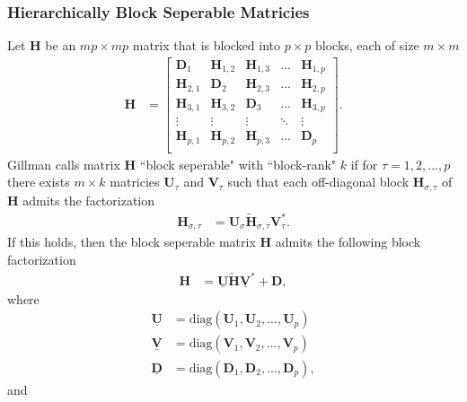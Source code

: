 \subsubsection{Hierarchically Block Seperable Matricies}

Let $\textbf{H}$ be an $mp \times mp$ matrix that is blocked into $p \times p$ blocks, each of size $m \times m$
\begin{align}
    \textbf{H} &=
    \begin{bmatrix}
        \textbf{D}_1     & \textbf{H}_{1,2} & \textbf{H}_{1,3} & ...    & \textbf{H}_{1,p} \\
        \textbf{H}_{2,1} & \textbf{D}_{2}   & \textbf{H}_{2,3} & ...    & \textbf{H}_{2,p} \\
        \textbf{H}_{3,1} & \textbf{H}_{3,2} & \textbf{D}_{3}   & ...    & \textbf{H}_{3,p} \\
        \vdots           & \vdots           & \vdots           & \ddots & \vdots           \\
        \textbf{H}_{p,1} & \textbf{H}_{p,2} & \textbf{H}_{p,3} & ...    & \textbf{D}_{p} \\
    \end{bmatrix}.
\end{align}
Gillman calls matrix $\textbf{H}$ ``block seperable" with ``block-rank" $k$ if for $\tau = 1,2,...,p$ there exists $m \times k$ matricies $\textbf{U}_{\tau}$ and $\textbf{V}_{\tau}$ such that each off-diagonal block $\textbf{H}_{\sigma, \tau}$ of $\textbf{H}$ admits the factorization
\begin{align}
    \textbf{H}_{\sigma, \tau} &= \textbf{U}_{\sigma} \tilde{\textbf{H}}_{\sigma, \tau} \textbf{V}_{\tau}^*.
\end{align}
If this holds, then the block seperable matrix $\textbf{H}$ admits the following block factorization
\begin{align}
    \textbf{H} &= \underline{\textbf{U}} \tilde{\textbf{H}} \underline{\textbf{V}}^* + \textbf{D},
\end{align}
where
\begin{align}
    \underline{\textbf{U}} &= \text{diag}(\textbf{U}_1, \textbf{U}_2, ..., \textbf{U}_p) \\
    \underline{\textbf{V}} &= \text{diag}(\textbf{V}_1, \textbf{V}_2, ..., \textbf{V}_p) \\
    \underline{\textbf{D}} &= \text{diag}(\textbf{D}_1, \textbf{D}_2, ..., \textbf{D}_p),
\end{align}
and

